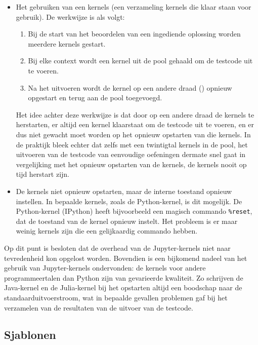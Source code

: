 \begin{itemize}
    \item Het gebruiken van een  kernels (een verzameling kernels die klaar staan voor gebruik).
    De werkwijze is als volgt:
    \begin{enumerate}
        \item Bij de start van het beoordelen van een ingediende oplossing worden meerdere kernels gestart.
        \item Bij elke context wordt een kernel uit de pool gehaald om de testcode uit te voeren.
        \item Na het uitvoeren wordt de kernel op een andere draad () opnieuw opgestart en terug aan de pool toegevoegd.
    \end{enumerate}
    Het idee achter deze werkwijze is dat door op een andere draad de kernels te herstarten, er altijd een kernel klaarstaat om de testcode uit te voeren, en er dus niet gewacht moet worden op het opnieuw opstarten van die kernels.
    In de praktijk bleek echter dat zelfs met een twintigtal kernels in de pool, het uitvoeren van de testcode van eenvoudige oefeningen dermate snel gaat in vergelijking met het opnieuw opstarten van de kernels, de kernels nooit op tijd herstart zijn.
    \item De kernels niet opnieuw opstarten, maar de interne toestand opnieuw instellen.
    In bepaalde kernels, zoals de Python-kernel, is dit mogelijk.
    De Python-kernel (IPython) heeft bijvoorbeeld een magisch commando \texttt{\%reset}, dat de toestand van de kernel opnieuw instelt.
    Het probleem is er maar weinig kernels zijn die een gelijkaardig commando hebben.
\end{itemize}

Op dit punt is besloten dat de overhead van de Jupyter-kernels niet naar tevredenheid kon opgelost worden.
Bovendien is een bijkomend nadeel van het gebruik van Jupyter-kernels ondervonden: de kernels voor andere programmeertalen dan Python zijn van gevarieerde kwaliteit.
Zo schrijven de Java-kernel en de Julia-kernel bij het opstarten altijd een boodschap naar de standaarduitvoerstroom, wat in bepaalde gevallen problemen gaf bij het verzamelen van de resultaten van de uitvoer van de testcode.

\subsection{Sjablonen}\label{subsec:sjablonen}


